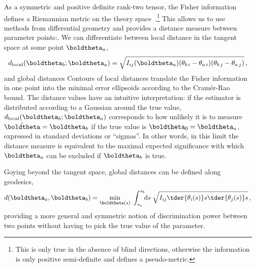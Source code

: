 
As a symmetric and positive definite rank-two tensor, the Fisher
information defines a Riemannian metric on the theory
space~\cite{information-geometry}.\footnote{This is only true in the
  absence of blind directions, otherwise the information is only
  positive semi-definite and defines a pseudo-metric.} This allows us
to use methods from differential geometry and provides a distance
measure between parameter points:. We can differentiate between local distance in the tangent
space at some point $\boldtheta_a$,
%
\begin{equation}
  d_{\text{local}}( \boldtheta_b; \boldtheta_a ) = \sqrt{I_{ij} (\boldtheta_a) (\theta_{b\,i} - \theta_{a\,i}) (\theta_{b\,j}  - \theta_{a\,j} )} \,,
  \label{eq:local_distances}
\end{equation}
%
and global distances 
%
Contours of local distances translate the Fisher information in one
point into the minimal error ellipsoids according to the Cram\'er-Rao
bound. The distance values have an intuitive interpretation: if the
estimator is distributed according to a Gaussian around the true
value, $d_{\text{local}}( \boldtheta_b; \boldtheta_a )$ corresponds to
how unlikely it is to measure $\hat{\boldtheta} = \boldtheta_b$ if the
true value is $\boldtheta_0 = \boldtheta_a$, expressed in standard
deviations or ``sigmas''. In other words, in this limit the distance
measure is equivalent to the maximal expected significance with which
$\boldtheta_a$ can be excluded if $\boldtheta_b$ is true.

Goying beyond the tangent space, global distances can be defined along geodesics,
%
\begin{equation}
  d(\boldtheta_a,\boldtheta_b)
  = \min_{\boldtheta(s)} \;
  \int_{s_a}^{s_b} \!\! \mathrm{d} s \; \sqrt{I_{ij} \tder {\theta_i (s)} s \tder {\theta_j (s)} s } \,,
  \label{eq:global_distances}
\end{equation}
%
providing a more general and symmetric notion of discrimination power
between two points without having to pick the true value of the
parameter.

